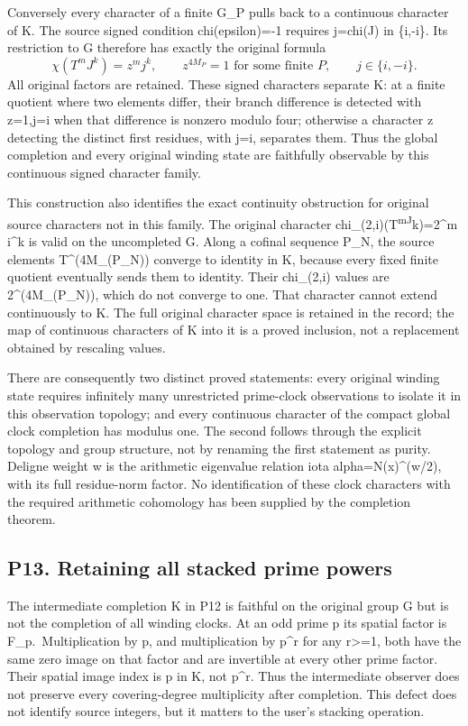 \documentclass[
  11pt,
]{article}
\begin{document}
Conversely every character of a finite G\_P pulls back to a continuous
character of K. The source signed condition chi(epsilon)=-1 requires
j=chi(J) in \{i,-i\}. Its restriction to G therefore has exactly the
original formula \[
\chi(T^mJ^k)=z^m j^k,
\qquad z^{4M_P}=1\text{ for some finite }P,
\qquad j\in\{i,-i\}.
\] All original factors are retained. These signed characters separate
K: at a finite quotient where two elements differ, their branch
difference is detected with z=1,j=i when that difference is nonzero
modulo four; otherwise a character z detecting the distinct first
residues, with j=i, separates them. Thus the global completion and every
original winding state are faithfully observable by this continuous
signed character family.

This construction also identifies the exact continuity obstruction for
original source characters not in this family. The original character
chi\_(2,i)(T\textsuperscript{mJ}k)=2\^{}m i\^{}k is valid on the
uncompleted G. Along a cofinal sequence P\_N, the source elements
T\^{}(4M\_(P\_N)) converge to identity in K, because every fixed finite
quotient eventually sends them to identity. Their chi\_(2,i) values are
2\^{}(4M\_(P\_N)), which do not converge to one. That character cannot
extend continuously to K. The full original character space is retained
in the record; the map of continuous characters of K into it is a proved
inclusion, not a replacement obtained by rescaling values.

There are consequently two distinct proved statements: every original
winding state requires infinitely many unrestricted prime-clock
observations to isolate it in this observation topology; and every
continuous character of the compact global clock completion has modulus
one. The second follows through the explicit topology and group
structure, not by renaming the first statement as purity. Deligne weight
w is the arithmetic eigenvalue relation \textbar iota
alpha\textbar=N(x)\^{}(w/2), with its full residue-norm factor. No
identification of these clock characters with the required arithmetic
cohomology has been supplied by the completion theorem.

\subsection{P13. Retaining all stacked prime
powers}\label{p13.-retaining-all-stacked-prime-powers}

The intermediate completion K in P12 is faithful on the original group G
but is not the completion of all winding clocks. At an odd prime p its
spatial factor is F\_p.~Multiplication by p, and multiplication by
p\^{}r for any r\textgreater=1, both have the same zero image on that
factor and are invertible at every other prime factor. Their spatial
image index is p in K, not p\^{}r. Thus the intermediate observer does
not preserve every covering-degree multiplicity after completion. This
defect does not identify source integers, but it matters to the user's
stacking operation.
\end{document}
